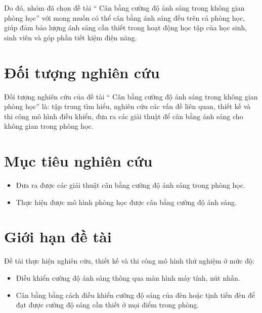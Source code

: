 Do đó, nhóm đã chọn đề tài “ Cân bằng cường độ ánh sáng trong không gian phòng học” với mong muốn có thể cân bằng ánh sáng đều trên cả phòng học, giúp đảm bảo lượng ánh sáng cần thiết trong hoạt động học tập của học sinh, sinh viên và  góp phần tiết kiệm điện năng.

\section{Đối tượng nghiên cứu}
Đối tượng nghiên cứu của đề tài “ Cân bằng cường độ ánh sáng trong không gian phòng học” là: tập trung tìm hiểu, nghiên cứu các vấn đề liên quan, thiết kế và thi công mô hình điều khiển, đưa ra các giải thuật để cân bằng ánh sáng cho không gian trong phòng học.

\section{Mục tiêu nghiên cứu}
\begin{itemize}
\item Đưa ra được các giải thuật cân bằng cường độ ánh sáng trong phòng học.
\item Thực hiện được mô hình phòng học được cân bằng cường độ ánh sáng.
\end{itemize}

\section{Giới hạn đề tài}
Đề tài thực hiện nghiên cứu, thiết kế và thi công mô hình thử nghiệm ở mức độ:
\begin{itemize}
\item Điều khiển cường độ ánh sáng thông qua màn hình máy tính, nút nhấn.
\item Cân bằng bằng cách điều khiển cường độ sáng của đèn hoặc tịnh tiến đèn để đạt được cường độ sáng cần thiết ở mọi điểm trong phòng.
\end{itemize}

